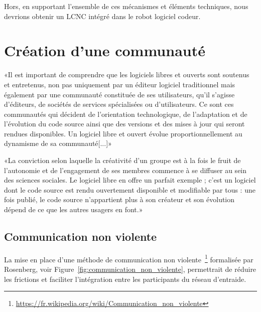 Hors, en supportant l'ensemble de ces mécanismes et éléments techniques, nous devrions obtenir un LCNC intégré dans le robot logiciel codeur.



\section{Création d’une communauté}


«Il est important de comprendre que les logiciels libres et ouverts sont soutenus et entretenus, non pas uniquement par un éditeur logiciel traditionnel mais également par une communauté constituée de ses utilisateurs, qu'il s'agisse d'éditeurs, de sociétés de services spécialisées ou d'utilisateurs. Ce sont ces communautés qui décident de l'orientation technologique, de l'adaptation et de l'évolution du code source ainsi que des versions et des mises à jour qui seront rendues disponibles. Un logiciel libre et ouvert évolue proportionnellement au dynamisme de sa communauté[...]»~\cite{tresor_gouv_logiciels_libres}

«La conviction selon laquelle la créativité d’un groupe est à la fois le fruit de l’autonomie et de l’engagement de ses membres commence à se diffuser au sein des sciences sociales. Le logiciel libre en offre un parfait exemple ; c’est un logiciel dont le code source est rendu ouvertement disponible et modifiable par tous : une fois publié, le code source n’appartient plus à son créateur et son évolution dépend de ce que les autres usagers en font.»~\cite{REDP_173_0387}

\subsection{Communication non violente}

La mise en place d’une méthode de communication non violente~\footnote{\url{https://fr.wikipedia.org/wiki/Communication_non_violente}} formalisée par Rosenberg, voir Figure~\ref{fig:communication_non_violente}, permettrait de réduire les frictions et faciliter l'intégration entre les participants du réseau d’entraide.

